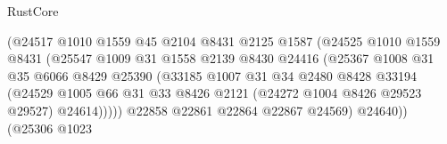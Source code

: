 \begin{lexlean}{RustCore}
\begin{coremodule}
                                        (@24517
                                          @1010
                                          @1559
                                          @45
                                          @2104
                                          @8431
                                          @2125
                                          @1587
                                          (@24525
                                            @1010
                                            @1559
                                            @8431
                                            (@25547
                                              @1009
                                              @31
                                              @1558
                                              @2139
                                              @8430
                                              @24416
                                              (@25367
                                                @1008
                                                @31
                                                @35
                                                @6066
                                                @8429
                                                @25390
                                                (@33185
                                                  @1007
                                                  @31
                                                  @34
                                                  @2480
                                                  @8428
                                                  @33194
                                                  (@24529
                                                    @1005
                                                    @66
                                                    @31
                                                    @33
                                                    @8426
                                                    @2121
                                                    (@24272 @1004 @8426 @29523 @29527)
                                                    @24614)))))
                                          @22858
                                          @22861
                                          @22864
                                          @22867
                                          @24569)
                                        @24640))
                                    (@25306
                                      @1023

\end{coremodule}
\end{lexlean}
